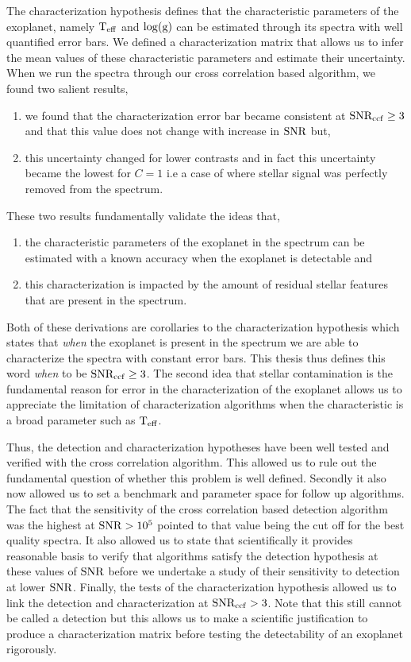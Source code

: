 The characterization hypothesis defines that the characteristic parameters of the exoplanet, namely $\rm{T_{eff}}$ and $\log(\rm{g})$ can be estimated through its spectra with well quantified error bars.
We defined a characterization matrix that allows us to infer the mean values of these characteristic parameters and estimate their uncertainty.
When we run the spectra through our cross correlation based algorithm, we found two salient results,
\begin{enumerate}
    \item we found that the characterization error bar became consistent at $\rm{SNR_{ccf}}\ge3$ and that this value does not change with increase in $\rm{SNR}$ but,
    \item this uncertainty changed for lower contrasts and in fact this uncertainty became the lowest for $C=1$ i.e a case of where stellar signal was perfectly removed from the spectrum.
\end{enumerate}
These two results fundamentally validate the ideas that,
\begin{enumerate}
    \item the characteristic parameters of the exoplanet in the spectrum can be estimated with a known accuracy when the exoplanet is detectable and
    \item this characterization is impacted by the amount of residual stellar features that are present in the spectrum.
\end{enumerate}
Both of these derivations are corollaries to the characterization hypothesis which states that \textit{when} the exoplanet is present in the spectrum we are able to characterize the spectra with constant error bars.
This thesis thus defines this word \textit{when} to be $\rm{SNR_{ccf}}\ge3$.
The second idea that stellar contamination is the fundamental reason for error in the characterization of the exoplanet allows us to appreciate the limitation of characterization algorithms when the characteristic is a broad parameter such as $\rm{T_{eff}}$.

Thus, the detection and characterization hypotheses have been well tested and verified with the cross correlation algorithm. 
This allowed us to rule out the fundamental question of whether this problem is well defined. 
Secondly it also now allowed us to set a benchmark and parameter space for follow up algorithms.
The fact that the sensitivity of the cross correlation based detection algorithm was the highest at $\rm{SNR}>10^{5}$ pointed to that value being the cut off for the best quality spectra.
It also allowed us to state that scientifically it provides reasonable basis to verify that algorithms satisfy the detection hypothesis at these values of $\rm{SNR}$ before we undertake a study of their sensitivity  to detection at lower $\rm{SNR}$.
Finally, the tests of the characterization hypothesis allowed us to link the detection and characterization at $\rm{SNR_{ccf}}>3$.
Note that this still cannot be called a detection but this allows us to make a scientific justification to produce a characterization matrix before testing the detectability of an exoplanet rigorously.
